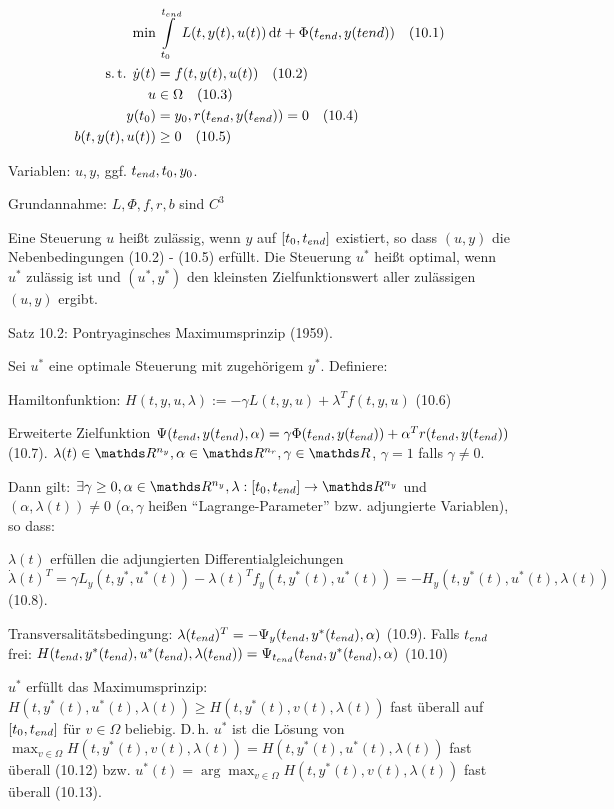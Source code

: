 

\begin{align*}
\min &\int\limits_{t_0}^{t_{end}} L(t,y(t),u(t)) \,\mathrm d t + \Phi({t_{end}}, y(tend)) \quad (10.1) \\
\text{s.\,t. } \dot y(t) &= f(t, y(t), u(t)) \quad (10.2) \\
u & \in \Omega \quad (10.3) \\
y(t_0) &= y_0, r({t_{end}}, y({t_{end}})) = 0 \quad (10.4) \\
b(t,y(t), u(t)) & \geq 0 \quad (10.5)
\end{align*}

Variablen: $u,y$, ggf. ${t_{end}}, t_0, y_0$.

Grundannahme: $L, \Phi, f, r, b$ sind $C^3$


Eine Steuerung $u$ heißt zulässig, wenn $y$ auf $[t_0, {t_{end}}]$ existiert, so dass $(u,y)$ die Nebenbedingungen (10.2) - (10.5) erfüllt. Die Steuerung $u^*$ heißt optimal, wenn $u^*$ zulässig ist und $(u^*, y^*)$ den kleinsten Zielfunktionswert aller zulässigen $(u,y)$ ergibt.


Satz 10.2: Pontryaginsches Maximumsprinzip (1959).

Sei $u^*$ eine optimale Steuerung mit zugehörigem $y^*$. Definiere:

\bitm
\item Hamiltonfunktion: $H(t,y,u,\lambda) := - \gamma L(t,y,u) + \lambda^T f(t,y,u)$ (10.6) \\
\item Erweiterte Zielfunktion $\Psi({t_{end}}, y({t_{end}}), \alpha) = \gamma \Phi({t_{end}}, y({t_{end}})) + \alpha^T r({t_{end}}, y({t_{end}}))$ (10.7). $\lambda(t) \in \R^{n_y}, \alpha \in \R^{n_r}, \gamma \in \R$, \obda $\gamma = 1$ falls $\gamma \neq 0$.
\eitm

Dann gilt: $\exists \gamma \geq 0, \alpha \in \R^{n_y}, \lambda : [t_0, \tend] \to \R^{n_y}$ und $(\alpha, \lambda(t)) \neq 0$ ($\alpha, \gamma$ heißen "`Lagrange-Parameter"' bzw. adjungierte Variablen), so dass:

\bitm
\item $\lambda(t)$ erfüllen die adjungierten Differentialgleichungen $\dot\lambda(t)^T = \gamma L_y (t, y^*, u^*(t)) - \lambda(t)^T f_y(t, y^*(t), u^*(t)) = - H_y (t, y^*(t), u^*(t), \lambda(t))$ (10.8).
\item Transversalitätsbedingung: $\lambda({t_{end}})^T = - \Psi_y ({t_{end}}, y^*({t_{end}}), \alpha)$ (10.9). Falls ${t_{end}}$ frei: $H({t_{end}}, y^*({t_{end}}), u^*({t_{end}}), \lambda({t_{end}})) = \Psi_{t_{end}}({t_{end}}, y^*({t_{end}}), \alpha)$ (10.10)
\item $u^*$ erfüllt das Maximumsprinzip: $H(t, y^*(t), u^*(t), \lambda(t)) \geq H(t,y^*(t), v(t), \lambda(t))$ fast überall auf $[t_0, {t_{end}}]$ für $v \in \Omega$ beliebig. D.\,h. $u^*$ ist die Lösung von $\max_{v\in \Omega} H(t, y^*(t), v(t), \lambda(t)) = H(t, y^*(t), u^*(t), \lambda(t))$ fast überall (10.12) bzw. $u^*(t) = \arg\max_{v\in \Omega} H(t, y^*(t), v(t), \lambda(t))$ fast überall (10.13).
\eitm 

